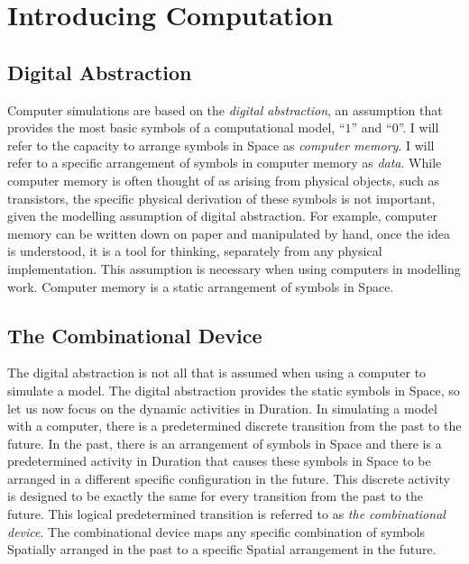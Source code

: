 \chapter{Introducing Computation}
\label{chapter:introducing_computation}

\section{Digital Abstraction}

Computer simulations are based on the \emph{digital abstraction}, an
assumption that provides the most basic symbols of a computational
model, ``$1$'' and ``$0$''.  I will refer to the capacity to arrange
symbols in Space as \emph{computer memory}.  I will refer to a
specific arrangement of symbols in computer memory as \emph{data}.
While computer memory is often thought of as arising from physical
objects, such as transistors, the specific physical derivation of
these symbols is not important, given the modelling assumption of
digital abstraction.  For example, computer memory can be written down
on paper and manipulated by hand, once the idea is understood, it is a
tool for thinking, separately from any physical implementation.  This
assumption is necessary when using computers in modelling work.
Computer memory is a static arrangement of symbols in Space.

\section{The Combinational Device}

The digital abstraction is not all that is assumed when using a
computer to simulate a model.  The digital abstraction provides the
static symbols in Space, so let us now focus on the dynamic activities
in Duration.  In simulating a model with a computer, there is a
predetermined discrete transition from the past to the future.  In the
past, there is an arrangement of symbols in Space and there is a
predetermined activity in Duration that causes these symbols in Space
to be arranged in a different specific configuration in the future.
This discrete activity is designed to be exactly the same for every
transition from the past to the future.  This logical predetermined
transition is referred to as \emph{the combinational device}.  The
combinational device maps any specific combination of symbols
Spatially arranged in the past to a specific Spatial arrangement in
the future.

